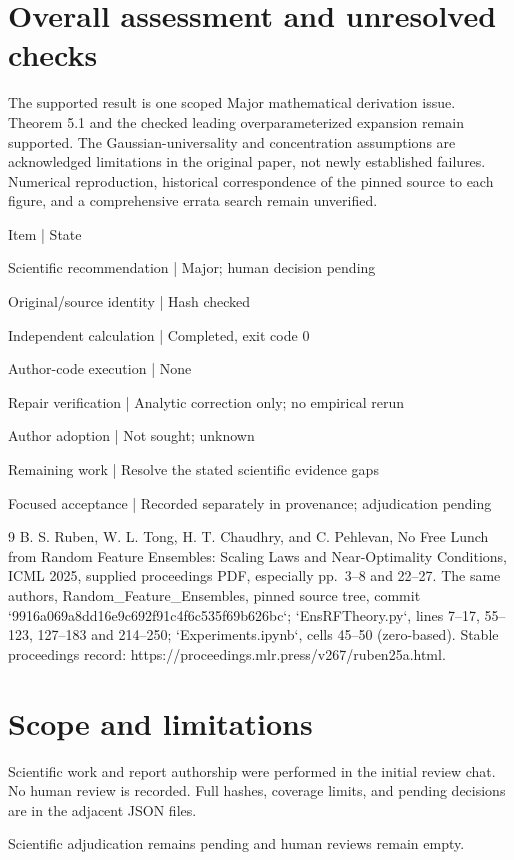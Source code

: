 \documentclass[10pt]{article}
\begin{document}
\section*{Overall assessment and unresolved checks}
The supported result is one scoped Major mathematical derivation issue. Theorem 5.1 and the checked leading overparameterized expansion remain supported. The Gaussian-universality and concentration assumptions are acknowledged limitations in the original paper, not newly established failures. Numerical reproduction, historical correspondence of the pinned source to each figure, and a comprehensive errata search remain unverified.\par
Item | State\par
Scientific recommendation | Major; human decision pending\par
Original/source identity | Hash checked\par
Independent calculation | Completed, exit code 0\par
Author-code execution | None\par
Repair verification | Analytic correction only; no empirical rerun\par
Author adoption | Not sought; unknown\par
Remaining work | Resolve the stated scientific evidence gaps\par
Focused acceptance | Recorded separately in provenance; adjudication pending\par
9 B. S. Ruben, W. L. Tong, H. T. Chaudhry, and C. Pehlevan, No Free Lunch from Random Feature Ensembles: Scaling Laws and Near-Optimality Conditions, ICML 2025, supplied proceedings PDF, especially pp. 3–8 and 22–27. The same authors, Random\_Feature\_Ensembles, pinned source tree, commit `9916a069a8dd16e9c692f91c4f6c535f69b626bc`; `EnsRFTheory.py`, lines 7–17, 55–123, 127–183 and 214–250; `Experiments.ipynb`, cells 45–50 (zero-based). Stable proceedings record: https://proceedings.mlr.press/v267/ruben25a.html.\par
\section*{Scope and limitations}
Scientific work and report authorship were performed in the initial review chat. No human review is recorded. Full hashes, coverage limits, and pending decisions are in the adjacent JSON files.\par
Scientific adjudication remains pending and human reviews remain empty.\par
\end{document}
